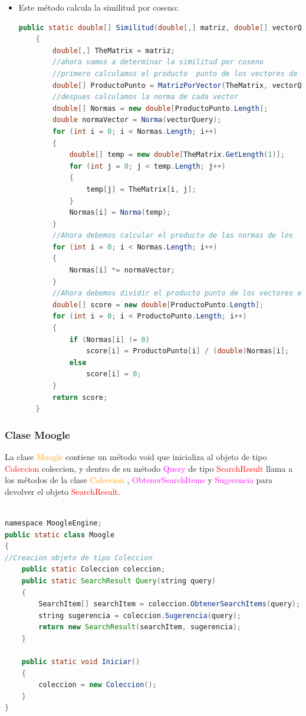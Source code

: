 \documentclass[a4paper, 12pt]{article}
\begin{document}
\begin{itemize}
\item Este método calcula la similitud por coseno:
\begin{lstlisting}[language=Java]
public static double[] Similitud(double[,] matriz, double[] vectorQuery)
    {
        double[,] TheMatrix = matriz;
        //ahora vamos a determinar la similitud por coseno
        //primero calculamos el producto  punto de los vectores de la matriz y el vector del query
        double[] ProductoPunto = MatrizPorVector(TheMatrix, vectorQuery);
        //despues calculamos la norma de cada vector
        double[] Normas = new double[ProductoPunto.Length];
        double normaVector = Norma(vectorQuery);
        for (int i = 0; i < Normas.Length; i++)
        {
            double[] temp = new double[TheMatrix.GetLength(1)];
            for (int j = 0; j < temp.Length; j++)
            {
                temp[j] = TheMatrix[i, j];
            }
            Normas[i] = Norma(temp);
        }
        //Ahora debemos calcular el producto de las normas de los  vectores 
        for (int i = 0; i < Normas.Length; i++)
        {
            Normas[i] *= normaVector;
        }
        //Ahora debemos dividir el producto punto de los vectores entre el producto de sus normas
        double[] score = new double[ProductoPunto.Length];
        for (int i = 0; i < ProductoPunto.Length; i++)
        {
            if (Normas[i] != 0)
                score[i] = ProductoPunto[i] / (double)Normas[i];
            else
                score[i] = 0;
        }
        return score;
    }
\end{lstlisting}
\end{itemize}



\subsubsection{Clase Moogle}\label{sub;moog}
La clase \textcolor{orange}{Moogle} contiene un método void que inicializa al objeto de tipo \textcolor{red}{Coleccion} coleccion, y dentro de su método \textcolor{magenta}{Query} de tipo \textcolor{red}{SearchResult} llama a los métodos de la clase \textcolor{orange}{Coleccion} , \textcolor{magenta}{ObtenerSearchItems} y
 \textcolor{magenta}{Sugerencia} para devolver el objeto \textcolor{red}{SearchResult}.
\begin{lstlisting}[language=Java]

namespace MoogleEngine;
public static class Moogle
{
//Creacion objeto de tipo Coleccion
    public static Coleccion coleccion;
    public static SearchResult Query(string query) 
    {
        SearchItem[] searchItem = coleccion.ObtenerSearchItems(query);
        string sugerencia = coleccion.Sugerencia(query);
        return new SearchResult(searchItem, sugerencia);
    }

    public static void Iniciar()
    {
        coleccion = new Coleccion();
    }
}
\end{lstlisting}
            
\end{document}

